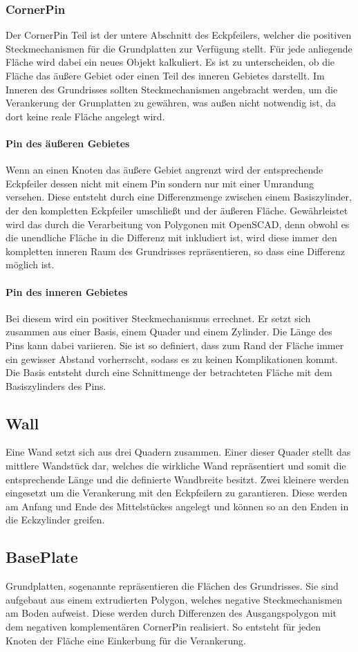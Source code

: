 \subsubsection{CornerPin}
Der CornerPin Teil ist der untere Abschnitt des Eckpfeilers, welcher die positiven Steckmechanismen für die Grundplatten zur Verfügung stellt.
Für jede anliegende Fläche wird dabei ein neues Objekt kalkuliert.
Es ist zu unterscheiden, ob die Fläche das äußere Gebiet oder einen Teil des inneren Gebietes darstellt.
Im Inneren des Grundrisses sollten Steckmechanismen angebracht werden, um die Verankerung der Grunplatten zu gewähren, was außen nicht notwendig ist, da dort keine reale Fläche angelegt wird.
\paragraph{Pin des äußeren Gebietes}
Wenn an einen Knoten das äußere Gebiet angrenzt wird der entsprechende Eckpfeiler dessen nicht mit einem Pin sondern nur mit einer Umrandung versehen.
Diese entsteht durch eine Differenzmenge zwischen einem Basiszylinder, der den kompletten Eckpfeiler umschließt und der äußeren Fläche.
Gewährleistet wird das durch die Verarbeitung von Polygonen mit OpenSCAD, denn obwohl es die unendliche Fläche in die Differenz mit inkludiert ist, wird diese immer den kompletten inneren Raum des Grundrisses repräsentieren, so dass eine Differenz möglich ist.
\paragraph{Pin des inneren Gebietes}
Bei diesem wird ein positiver Steckmechanismus errechnet.
Er setzt sich zusammen aus einer Basis, einem Quader und einem Zylinder.
Die Länge des Pins kann dabei variieren.
Sie ist so definiert, dass zum Rand der Fläche immer ein gewisser Abstand vorherrscht, sodass es zu keinen Komplikationen kommt.
Die Basis entsteht durch eine Schnittmenge der betrachteten Fläche mit dem Basiszylinders des Pins.
\subsection{Wall}
Eine Wand setzt sich aus drei Quadern zusammen. 
Einer dieser Quader stellt das mittlere Wandstück dar, welches die wirkliche Wand repräsentiert und somit die entsprechende Länge und die definierte  Wandbreite besitzt.
Zwei kleinere werden eingesetzt um die Verankerung mit den Eckpfeilern zu garantieren.
Diese werden am Anfang und Ende des Mittelstückes angelegt und können so an den Enden in die Eckzylinder greifen.
\subsection{BasePlate}
Grundplatten, sogenannte  repräsentieren die Flächen des Grundrisses.
Sie sind aufgebaut aus einem extrudierten Polygon, welches negative Steckmechanismen am Boden aufweist.
Diese werden durch Differenzen des Ausgangspolygon mit dem negativen komplementären CornerPin realisiert.
So entsteht für jeden Knoten der Fläche eine Einkerbung für die Verankerung.
